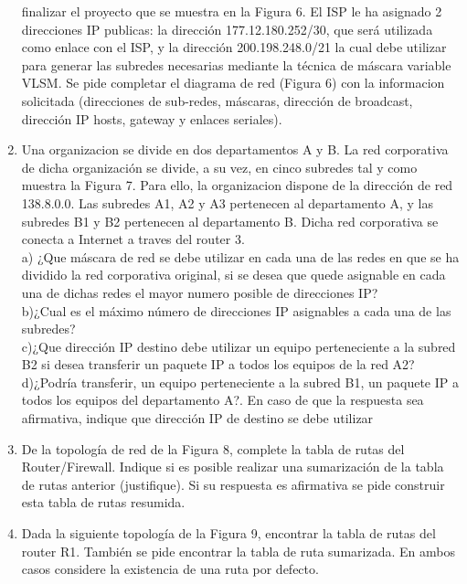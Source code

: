 \documentclass{udparticle}
\begin{document}
\begin{enumerate}
finalizar el proyecto que se muestra en la Figura 6. El ISP le ha asignado 2 
direcciones IP publicas: la dirección 177.12.180.252/30, que será utilizada como 
enlace con el ISP, y la dirección 200.198.248.0/21 la cual debe utilizar para 
generar las subredes necesarias mediante la técnica de máscara variable VLSM.
Se pide completar el diagrama de red (Figura 6) con la informacion solicitada
(direcciones de sub-redes, máscaras, dirección de broadcast, dirección IP 
hosts, gateway y enlaces seriales).
\clearpage
\item Una organizacion se divide en dos departamentos A y B. La red corporativa de 
dicha organización se divide, a su vez, en cinco subredes tal y como muestra la 
Figura 7. Para ello, la organizacion dispone de la dirección de red 138.8.0.0. 
Las subredes A1, A2 y A3 pertenecen al departamento A, y las subredes B1 y B2 
pertenecen al departamento B. Dicha red corporativa se conecta a Internet    a traves 
del router 3.\\
a) ¿Que máscara de red se debe utilizar en cada una de las redes en que se ha   
dividido la red corporativa original, si se desea que quede asignable en cada una 
de dichas redes el mayor numero posible de direcciones IP?\\

b)¿Cual es el máximo número de direcciones IP asignables a cada una de las subredes?\\

c)¿Que dirección IP destino debe utilizar un equipo perteneciente a la subred B2 si
desea transferir un paquete IP a todos los equipos de la red A2?\\

d)¿Podría transferir, un equipo perteneciente a la subred B1, un paquete IP a todos
los equipos del departamento A?. En caso de que la respuesta sea afirmativa,
indique que dirección IP de destino se debe utilizar\\


\item De la topología de red de la Figura 8, complete la tabla de rutas del 
Router/Firewall. Indique si es posible realizar una sumarización de la tabla de 
rutas anterior (justifique). Si su respuesta es afirmativa se pide construir esta tabla de rutas resumida.

\item Dada la siguiente topología de la Figura 9, encontrar la tabla de rutas del 
router R1. También se pide encontrar la tabla de ruta sumarizada. En ambos casos 
considere la existencia de una ruta por defecto.


\end{enumerate}
\end{document}
